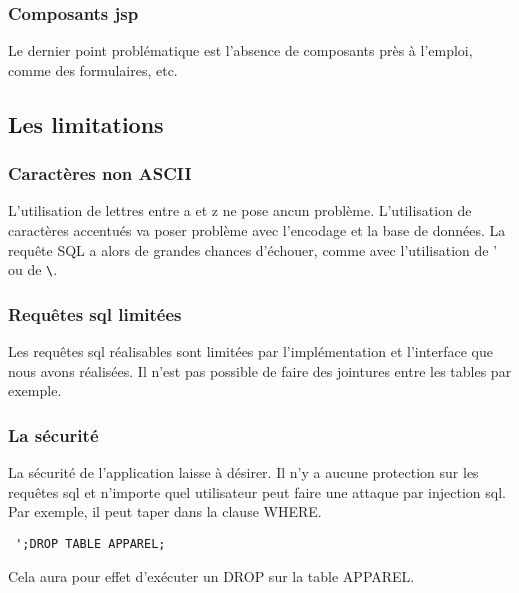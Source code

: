 \subsubsection{Composants jsp}
Le dernier point problématique est l'absence de composants près à l'emploi, comme des formulaires, etc.
\subsection{Les limitations}
\subsubsection{Caractères non ASCII}
L'utilisation de lettres entre a et z ne pose ancun problème. L'utilisation de caractères accentués va poser problème avec l'encodage et la base de données. La requête SQL a alors de grandes chances d'échouer, comme avec l'utilisation de ' ou de \verb|\|.
\subsubsection{Requêtes sql limitées}
Les requêtes sql réalisables sont limitées par l'implémentation et l'interface que nous avons réalisées. Il n'est pas possible de faire des jointures entre les tables par exemple.
\subsubsection{La sécurité}
La sécurité de l'application laisse à désirer. Il n'y a aucune protection sur les requêtes sql et n'importe quel utilisateur peut faire une attaque par injection sql. 
Par exemple, il peut taper dans la clause WHERE.
\begin{verbatim}
 ';DROP TABLE APPAREL;
\end{verbatim}
Cela aura pour effet d'exécuter un DROP sur la table APPAREL.


